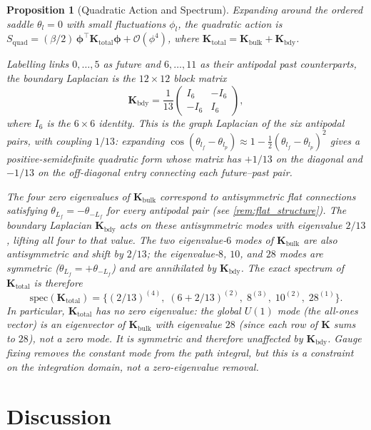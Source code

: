 \documentclass[12pt, a4paper]{article}
\theoremstyle{plain}
\newtheorem{proposition}[theorem]{Proposition}
\theoremstyle{definition}
\theoremstyle{remark}
\newcommand{\Kmat}{\mathbf{K}}
\begin{document}
\begin{proposition}[Quadratic Action and Spectrum]\label{prop:quadratic}
Expanding around the ordered saddle $\theta_l = 0$ with small
fluctuations $\phi_l$, the quadratic action is
$S_\mathrm{quad} = (\beta/2)\,\bm{\phi}^\top\Kmat_\mathrm{total}
\bm{\phi} + \mathcal{O}(\phi^4)$,
where $\Kmat_\mathrm{total} = \Kmat_\mathrm{bulk} + \Kmat_\mathrm{bdy}$.
 
Labelling links $0,\ldots,5$ as future and $6,\ldots,11$ as their
antipodal past counterparts, the boundary Laplacian is the
$12\times12$ block matrix
\[
  \Kmat_\mathrm{bdy}
  = \frac{1}{13}
  \begin{pmatrix} I_6 & -I_6 \\ -I_6 & I_6 \end{pmatrix},
\]
where $I_6$ is the $6\times6$ identity.
This is the graph Laplacian of the six antipodal pairs, with
coupling $1/13$: expanding $\cos(\theta_{l_f}-\theta_{l_p})
\approx 1 - \tfrac{1}{2}(\theta_{l_f}-\theta_{l_p})^2$ gives
a positive-semidefinite quadratic form whose matrix has
$+1/13$ on the diagonal and $-1/13$ on the off-diagonal entry
connecting each future--past pair.
 
The four zero eigenvalues of $\Kmat_\mathrm{bulk}$ correspond
to antisymmetric flat connections satisfying
$\theta_{L_f} = -\theta_{-L_f}$ for every antipodal pair
(see \cref{rem:flat_structure}).
The boundary Laplacian $\Kmat_\mathrm{bdy}$ acts on these
antisymmetric modes with eigenvalue $2/13$, lifting all four
to that value.
The two eigenvalue-$6$ modes of $\Kmat_\mathrm{bulk}$ are also
antisymmetric and shift by $2/13$;
the eigenvalue-$8$, $10$, and $28$ modes are symmetric
($\theta_{L_f} = +\theta_{-L_f}$) and are annihilated by
$\Kmat_\mathrm{bdy}$.
The exact spectrum of $\Kmat_\mathrm{total}$ is therefore
\[
  \mathrm{spec}(\Kmat_\mathrm{total})
  = \bigl\{(2/13)^{(4)},\; (6+2/13)^{(2)},\;
            8^{(3)},\; 10^{(2)},\; 28^{(1)}\bigr\}.
\]
In particular, $\Kmat_\mathrm{total}$ has no zero eigenvalue:
the global $U(1)$ mode (the all-ones vector) is an eigenvector
of $\Kmat_\mathrm{bulk}$ with eigenvalue $28$
(since each row of $\Kmat$ sums to $28$),
not a zero mode.
It is symmetric and therefore unaffected by $\Kmat_\mathrm{bdy}$.
Gauge fixing removes the constant mode from the path integral,
but this is a constraint on the integration domain, not a
zero-eigenvalue removal.
\end{proposition}

\section{Discussion}\label{sec:discussion}
\end{document}
